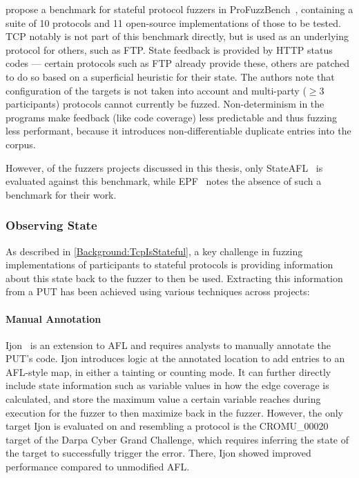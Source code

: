 \documentclass[twocolumn]{article}
\let\savedCite=\cite
\renewcommand{\cite}{\unskip~\savedCite}
\begin{document}
\citeauthor{ProFuzzBench} propose a benchmark for stateful protocol fuzzers in ProFuzzBench\cite{ProFuzzBench}, containing a suite of 10 protocols and 11 open-source implementations of those to be tested. TCP notably is not part of this benchmark directly, but is used as an underlying protocol for others, such as FTP. State feedback is provided by HTTP status codes — certain protocols such as FTP already provide these, others are patched to do so based on a superficial heuristic for their state. The authors note that configuration of the targets is not taken into account and multi-party ($\geq 3$ participants) protocols cannot currently be fuzzed. Non-determinism in the programs make feedback (like code coverage) less predictable and thus fuzzing less performant, because it introduces non-differentiable duplicate entries into the corpus.

However, of the fuzzers projects discussed in this thesis, only StateAFL\cite{StateAFL} is evaluated against this benchmark, while EPF\cite{EPF} notes the absence of such a benchmark for their work.

\subsubsection{Observing State}

As described in \cref{Background:TcpIsStateful}, a key challenge in fuzzing implementations of participants to stateful protocols is providing information about this state back to the fuzzer to then be used. Extracting this information from a PUT has been achieved using various techniques across projects:

\paragraph{Manual Annotation}

Ijon\cite{Ijon} is an extension to AFL and requires analysts to manually annotate the PUT's code. Ijon introduces logic at the annotated location to add entries to an AFL-style map, in either a tainting or counting mode. It can further directly include state information such as variable values in how the edge coverage is calculated, and store the maximum value a certain variable reaches during execution for the fuzzer to then maximize back in the fuzzer. However, the only target Ijon is evaluated on and resembling a protocol is the CROMU\_00020 target of the Darpa Cyber Grand Challenge, which requires inferring the state of the target to successfully trigger the error. There, Ijon showed improved performance compared to unmodified AFL.
\end{document}
